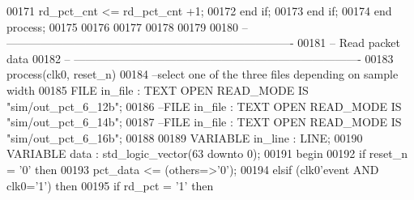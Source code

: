 \begin{DoxyCode}
00171             \textcolor{vhdlchar}{rd_pct_cnt} \textcolor{vhdlchar}{<=} \textcolor{vhdlchar}{rd_pct_cnt} \textcolor{vhdlchar}{+}\textcolor{vhdllogic}{}\textcolor{vhdllogic}{1};
00172          \textcolor{keywordflow}{end} \textcolor{keywordflow}{if};
00173       \textcolor{keywordflow}{end} \textcolor{keywordflow}{if};
00174    \textcolor{keywordflow}{end} \textcolor{keywordflow}{process};
00175    
00176    
00177    
00178 
00179    
00180 \textcolor{keyword}{-- ----------------------------------------------------------------------------}
00181 \textcolor{keyword}{-- Read packet data}
00182 \textcolor{keyword}{-- ----------------------------------------------------------------------------   }
00183 \textcolor{keywordflow}{process}(clk0, reset_n)
00184 \textcolor{keyword}{   --select one of the three files depending on sample width}
00185    \textcolor{keywordflow}{FILE} in\_file      : TEXT \textcolor{keywordflow}{OPEN} READ\_MODE \textcolor{keywordflow}{IS} \textcolor{keyword}{"sim/out\_pct\_6\_12b"};
00186 \textcolor{keyword}{   --FILE in\_file      : TEXT OPEN READ\_MODE IS "sim/out\_pct\_6\_14b";}
00187 \textcolor{keyword}{   --FILE in\_file      : TEXT OPEN READ\_MODE IS "sim/out\_pct\_6\_16b";}
00188    
00189    \textcolor{keywordflow}{VARIABLE} \textcolor{vhdlchar}{in\_line}  \textcolor{vhdlchar}{:} \textcolor{vhdlchar}{LINE};
00190    \textcolor{keywordflow}{VARIABLE} \textcolor{vhdlchar}{data}     \textcolor{vhdlchar}{:} \textcolor{comment}{std\_logic\_vector}\textcolor{vhdlchar}{(}\textcolor{vhdllogic}{}\textcolor{vhdllogic}{63} \textcolor{keywordflow}{downto} \textcolor{vhdllogic}{}\textcolor{vhdllogic}{0}\textcolor{vhdlchar}{)};
00191 \textcolor{vhdlkeyword}{begin}
00192    \textcolor{keywordflow}{if} \textcolor{vhdlchar}{reset_n} \textcolor{vhdlchar}{=} \textcolor{vhdlchar}{'}\textcolor{vhdllogic}{}\textcolor{vhdllogic}{0}\textcolor{vhdlchar}{'} \textcolor{keywordflow}{then} 
00193       \textcolor{vhdlchar}{pct_data} \textcolor{vhdlchar}{<=} \textcolor{vhdlchar}{(}\textcolor{keywordflow}{others}\textcolor{vhdlchar}{=}\textcolor{vhdlchar}{>}\textcolor{vhdlchar}{'}\textcolor{vhdllogic}{}\textcolor{vhdllogic}{0}\textcolor{vhdlchar}{'}\textcolor{vhdlchar}{)};
00194    \textcolor{keywordflow}{elsif} \textcolor{vhdlchar}{(}\textcolor{vhdlchar}{clk0}\textcolor{vhdlchar}{'}\textcolor{vhdlkeyword}{event} \textcolor{keywordflow}{AND} \textcolor{vhdlchar}{clk0}\textcolor{vhdlchar}{=}\textcolor{vhdlchar}{'}\textcolor{vhdllogic}{}\textcolor{vhdllogic}{1}\textcolor{vhdlchar}{'}\textcolor{vhdlchar}{)} \textcolor{keywordflow}{then} 
00195       \textcolor{keywordflow}{if} \textcolor{vhdlchar}{rd_pct} \textcolor{vhdlchar}{=} \textcolor{vhdlchar}{'}\textcolor{vhdllogic}{}\textcolor{vhdllogic}{1}\textcolor{vhdlchar}{'} \textcolor{keywordflow}{then} 

\end{DoxyCode}
